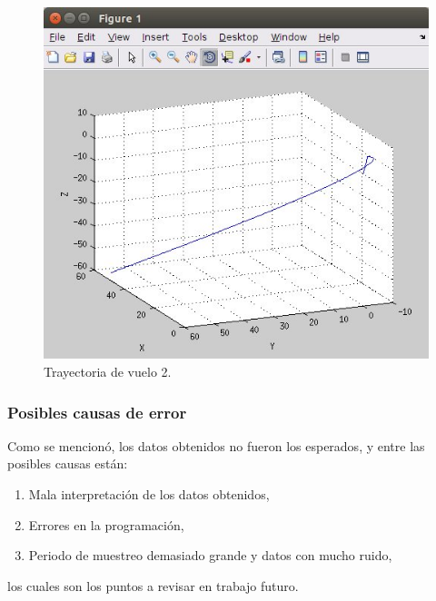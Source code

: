 		\begin{figure}[h]
		\begin{center}
		\includegraphics[scale=0.4]{imagenes/3-boomerang/tray_vue_2.jpg}
		\caption{Trayectoria de vuelo 2.}
		\label{fig23}
		\end{center}
		\end{figure}
\newpage
	\subsubsection{Posibles causas de error}

	Como se mencionó, los datos obtenidos no fueron los esperados, y entre las posibles causas están:

	\begin{enumerate}
	\item Mala interpretación de los datos obtenidos,
	\item Errores en la programación,
	\item Periodo de muestreo demasiado grande y datos con mucho ruido,
	\end{enumerate}

	los cuales son los puntos a revisar en trabajo futuro.
